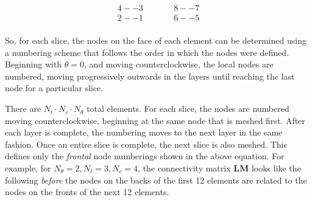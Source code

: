 \documentclass[10pt]{article}
\begin{document}
\begin{equation}
\begin{aligned}
4 -- 3 & \quad\quad & 8 -- 7\\
2 -- 1 & \quad\quad & 6 -- 5\\
\end{aligned}
\end{equation}

So, for each slice, the nodes on the face of each element can be determined using a numbering scheme that follows the order in which the nodes were defined. Beginning with \(\theta=0\), and moving counterclockwise, the local nodes are numbered, moving progressively outwards in the layers until reaching the last node for a particular slice. 

There are \(N_t\cdot N_c\cdot N_\theta\) total elements. For each slice, the nodes are numbered moving counterclockwise, beginning at the same node that is meshed first. After each layer is complete, the numbering moves to the next layer in the same fashion. Once an entire slice is complete, the next slice is also meshed. This defines only the \textit{frontal} node numberings shown in the above equation. For example, for \(N_\theta=2, N_t=3, N_c=4\), the connectivity matrix \(\textbf{LM}\) looks like the following \textit{before} the nodes on the backs of the first 12 elements are related to the nodes on the fronts of the next 12 elements.
\end{document}
